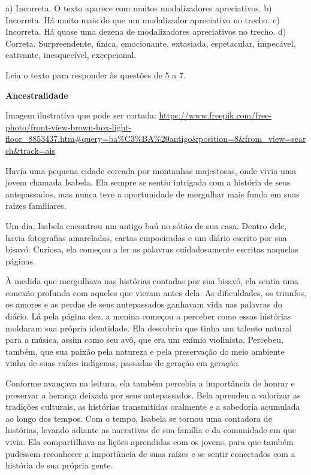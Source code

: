 \begin{itemize}
\begin{itemize}
{\begin{itemize}
\begin{itemize}
\begin{escolha}
\begin{escolha}
\begin{escolha}
\begin{escolha}
\begin{escolha}
\begin{escolha}
\begin{escolha}
\begin{escolha}
\begin{escolha}
\begin{escolha}
\begin{escolha}
\begin{escolha}
a) Incorreta. O texto aparece com muitos modalizadores apreciativos. b)
Incorreta. Há muito mais do que um modalizador apreciativo no trecho. c)
Incorreta. Há quase uma dezena de modalizadores apreciativos no trecho.
d) Correta. Surpreendente, única, emocionante, extasiada, espetacular,
impecável, cativante, inesquecível, excepcional.

Leia o texto para responder às questões de 5 a 7.

\textbf{Ancestralidade}

Imagem ilustrativa que pode ser cortada:
\url{https://www.freepik.com/free-photo/front-view-brown-box-light-floor_8853437.htm\#query=ba\%C3\%BA\%20antigo\&position=8\&from_view=search\&track=ais}

Havia uma pequena cidade cercada por montanhas majestosas, onde vivia
uma jovem chamada Isabela. Ela sempre se sentiu intrigada com a história
de seus antepassados, mas nunca teve a oportunidade de mergulhar mais
fundo em suas raízes familiares.

Um dia, Isabela encontrou um antigo baú no sótão de sua casa. Dentro
dele, havia fotografias amareladas, cartas empoeiradas e um diário
escrito por sua bisavó. Curiosa, ela começou a ler as palavras
cuidadosamente escritas naquelas páginas.

À medida que mergulhava nas histórias contadas por sua bisavó, ela
sentia uma conexão profunda com aqueles que vieram antes dela. As
dificuldades, os triunfos, os amores e as perdas de seus antepassados
ganhavam vida nas palavras do diário. Lá pela página dez, a menina
começou a perceber como essas histórias moldaram sua própria identidade.
Ela descobriu que tinha um talento natural para a música, assim como seu
avô, que era um exímio violinista. Percebeu, também, que sua paixão pela
natureza e pela preservação do meio ambiente vinha de suas raízes
indígenas, passadas de geração em geração.

Conforme avançava na leitura, ela também percebia a importância de
honrar e preservar a herança deixada por seus antepassados. Bela
aprendeu a valorizar as tradições culturais, as histórias transmitidas
oralmente e a sabedoria acumulada ao longo dos tempos. Com o tempo,
Isabela se tornou uma contadora de histórias, levando adiante as
narrativas de sua família e da comunidade em que vivia. Ela
compartilhava as lições aprendidas com os jovens, para que também
pudessem reconhecer a importância de suas raízes e se sentir conectados
com a história de sua própria gente.


\end{escolha}
\end{escolha}
\end{escolha}
\end{escolha}
\end{escolha}
\end{escolha}
\end{escolha}
\end{escolha}
\end{escolha}
\end{escolha}
\end{escolha}
\end{escolha}
\end{itemize}
\end{itemize}}
\end{itemize}
\end{itemize}
